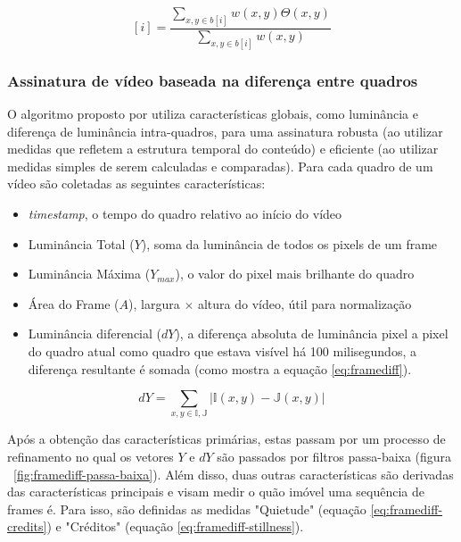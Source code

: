 \begin{equation}
	\label{eq:gradientes}
	[i] = \frac{\sum_{x,y \in b[i]} w(x,y)\Theta (x,y)}{\sum_{x,y \in b[i]} w(x,y)}
\end{equation}
    
%
%

\subsubsection{Assinatura de vídeo baseada na diferença entre quadros}
\label{sec:framediff}

  O algoritmo proposto por \cite{cook2011efficient} utiliza características globais, como luminância e diferença de luminância intra-quadros, para uma assinatura robusta (ao utilizar medidas que refletem a estrutura temporal do conteúdo) e eficiente (ao utilizar medidas simples de serem calculadas e comparadas). Para cada quadro de um vídeo são coletadas as seguintes características: 

  \begin{itemize}
    \item \textit{timestamp}, o tempo do quadro relativo ao início do vídeo
    \item Luminância Total ($Y$), soma da luminância de todos os pixels de um frame
    \item Luminância Máxima ($Y_{max}$), o valor do pixel mais brilhante do quadro
    \item Área do Frame ($A$), largura $\times$ altura do vídeo, útil para normalização
    \item Luminância diferencial ($dY$), a diferença absoluta de luminância pixel a pixel do quadro atual como quadro que estava visível há 100 milisegundos, a diferença resultante é somada (como mostra a equação \ref{eq:framediff}). 
  \end{itemize}

\begin{equation}
	\label{eq:framediff}
	dY = \sum_{x,y \in  \mathbb{I,J}} |\mathbb{I}(x,y) - \mathbb{J}(x,y)|
\end{equation} 

  Após a obtenção das características primárias, estas passam por um processo de refinamento no qual os vetores $Y$ e $dY$ são passados por filtros passa-baixa (figura ~\ref{fig:framediff-passa-baixa}). Além disso, duas outras características são derivadas das características principais e visam medir o quão imóvel uma sequência de frames é. Para isso, são definidas as medidas "Quietude" (equação \ref{eq:framediff-credits}) e "Créditos" (equação \ref{eq:framediff-stillness}).

